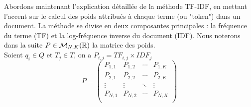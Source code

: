 \documentclass[12pt]{article}
\theoremstyle{definition}
\begin{document}
	\newpage
	
	Abordons maintenant l'explication détaillée de la méthode TF-IDF, en mettant l'accent sur le calcul des poids attribués à chaque terme (ou "token") dans un document. La méthode se divise en deux composantes principales : la fréquence du terme (TF) et la log-fréquence inverse du document (IDF). Nous noterons dans la suite $P\in \mathcal{M}_{N,K}(\mathbb{R})$ la matrice des poids.\\
	
	
	Soient $q_i\in Q$ et $T_j\in T$, on a $P_{i,j} = TF_{i,j}\times IDF_j$
	$$P = \begin{pmatrix}
		P_{1,1} & P_{1,2} & \cdots & P_{1,K} \\
		P_{2,1} & P_{2,2} & \cdots & P_{2,K} \\
		\vdots  & \vdots  & \ddots & \vdots  \\
		P_{N,1} & P_{N,2} & \cdots & P_{N,K} \\
	\end{pmatrix}$$
	
\end{document}
